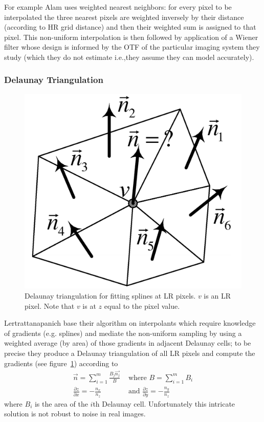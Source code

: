 For example Alam \cite{Alam2000} uses weighted nearest neighbors: for every pixel to be interpolated the three nearest pixels are weighted inversely by their distance (according to HR grid distance) and then their weighted sum is assigned to that pixel.
%
This non-uniform interpolation is then followed by application of a Wiener filter whose design is informed by the OTF of the particular imaging system they study (which they do not estimate i.e.,they assume they can model accurately).
%
\subsubsection{Delaunay Triangulation}

\begin{figure}
    \centering
    \includegraphics[width=.7\linewidth]{figures/classical/delauney.png}
    \caption{Delaunay triangulation for fitting splines at LR pixels\cite{Lertrattanapanich}. \(v\) is an LR pixel. Note that \(v\) is at \(z\) equal to the pixel value.}
    \label{fig:delauney}
\end{figure}
Lertrattanapanich \cite{Lertrattanapanich} base their algorithm on interpolants which require knowledge of gradients (e.g. splines) and mediate the non-uniform sampling by using a weighted average (by area) of those gradients in adjacent Delaunay cells; to be precise they produce a Delaunay triangulation of all LR pixels and compute the gradients (see figure~\ref{fig:delauney}) according to
\begin{align*}
    \vec{n} = \sum_{i=1}^m \frac{B_j \vec{n_j}}{B}   & \text{ where } B=\sum_{i=1}^m B_i                              \\
    \frac{\partial z}{\partial x} = -\frac{n_x}{n_z} & \text{ and }  \frac{\partial z}{\partial y} = -\frac{n_y}{n_z}
\end{align*}
where \(B_i\) is the area of the \(i\)th Delaunay cell.
%
Unfortunately this intricate solution is not robust to noise in real images.
